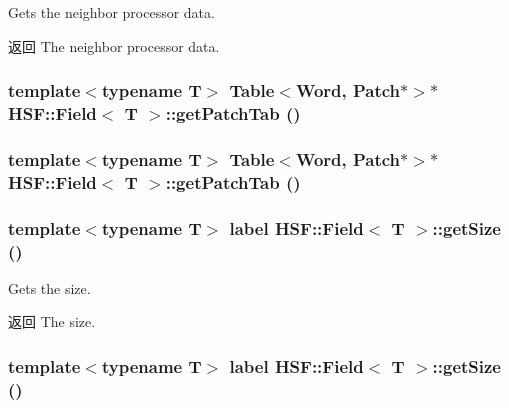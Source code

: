 Gets the neighbor processor data. \begin{DoxyReturn}{返回}
The neighbor processor data. 
\end{DoxyReturn}
\hypertarget{classHSF_1_1Field_ae24798c8bdfd10a71f32cd7be92e570c}{
\subsubsection[{getPatchTab}]{\setlength{\rightskip}{0pt plus 5cm}template$<$typename T$>$ Table$<$Word, {\bf Patch}$\ast$$>$$\ast$ {\bf HSF::Field}$<$ T $>$::getPatchTab ()}}
\label{classHSF_1_1Field_ae24798c8bdfd10a71f32cd7be92e570c}
\hypertarget{classHSF_1_1Field_ae24798c8bdfd10a71f32cd7be92e570c}{
\subsubsection[{getPatchTab}]{\setlength{\rightskip}{0pt plus 5cm}template$<$typename T$>$ Table$<$Word, {\bf Patch}$\ast$$>$$\ast$ {\bf HSF::Field}$<$ T $>$::getPatchTab ()}}
\label{classHSF_1_1Field_ae24798c8bdfd10a71f32cd7be92e570c}
\hypertarget{classHSF_1_1Field_aad566df51a130e83b42ae93ea2958eb1}{
\subsubsection[{getSize}]{\setlength{\rightskip}{0pt plus 5cm}template$<$typename T$>$ label {\bf HSF::Field}$<$ T $>$::getSize ()}}
\label{classHSF_1_1Field_aad566df51a130e83b42ae93ea2958eb1}


Gets the size. \begin{DoxyReturn}{返回}
The size. 
\end{DoxyReturn}
\hypertarget{classHSF_1_1Field_aad566df51a130e83b42ae93ea2958eb1}{
\subsubsection[{getSize}]{\setlength{\rightskip}{0pt plus 5cm}template$<$typename T$>$ label {\bf HSF::Field}$<$ T $>$::getSize ()}}
\label{classHSF_1_1Field_aad566df51a130e83b42ae93ea2958eb1}


